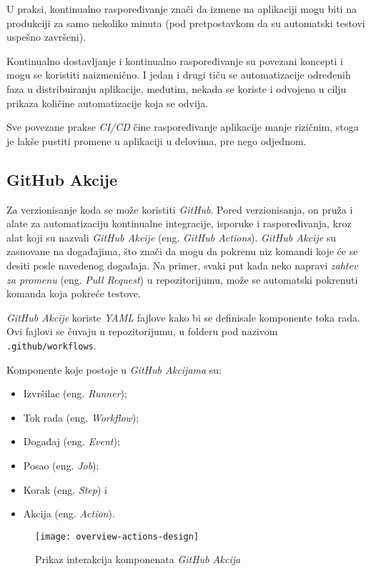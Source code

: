 U praksi, kontinualno raspoređivanje znači da izmene na aplikaciji mogu biti na produkciji za samo 
nekoliko minuta (pod pretpostavkom da su automatski testovi uspešno završeni).

Kontinualno dostavljanje i kontinualno raspoređivanje su povezani koncepti i mogu se koristiti naizmenično. 
I jedan i drugi tiču se automatizacije određenih faza u distribuiranju aplikacije, 
međutim, nekada se koriste i odvojeno u cilju prikaza količine automatizacije koja se odvija.

Sve povezane prakse \textit{CI/CD} čine raspoređivanje aplikacije manje rizičnim, stoga je lakše pustiti 
promene u aplikaciji u delovima, pre nego odjednom.~\cite{CI_CD}

\subsection{GitHub Akcije}
Za verzionisanje koda se može koristiti \textit{GitHub}. Pored verzionisanja, on pruža i alate za automatizaciju 
kontinualne integracije, isporuke i raspoređivanja, kroz alat koji su nazvali \textit{GitHub Akcije} 
(eng. \textit{GitHub Actions}). 
\textit{GitHub Akcije} su zasnovane na događajima, što znači da mogu da pokrenu niz komandi koje će se desiti 
posle navedenog događaja. Na primer, svaki put kada neko napravi \textit{zahtev za promenu} 
(eng. \textit{Pull Request}) u repozitorijumu, može se automatski pokrenuti komanda koja pokreće 
testove. 

\textit{GitHub Akcije} koriste \textit{YAML} fajlove kako bi se definisale komponente toka rada. Ovi fajlovi 
se čuvaju u repozitorijumu, u folderu pod nazivom \mbox{\texttt{.github/workflows}}.

Komponente koje postoje u \textit{GitHub Akcijama} su: 

\begin{itemize}
    \item Izvršilac (eng. \textit{Runner});
    \item Tok rada (eng. \textit{Workflow});
    \item Događaj (eng. \textit{Event});
    \item Posao (eng. \textit{Job});
    \item Korak (eng. \textit{Step}) i
    \item Akcija (eng. \textit{Action}).
\end{itemize}

\begin{figure}[h]
    \centering
    \texttt{[image: overview-actions-design]}
    \caption{Prikaz interakcija komponenata \textit{GitHub Akcija}}
\end{figure}

